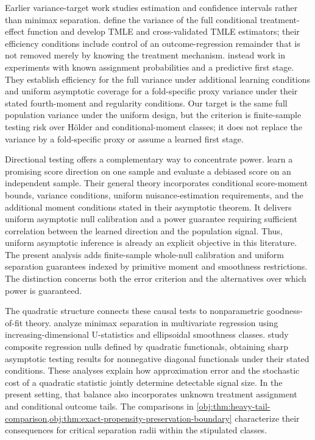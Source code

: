 \documentclass[11pt]{article}
\begin{document}
Earlier variance-target work studies estimation and confidence intervals rather than minimax separation. \citet[Sections 2.1--2.3]{Levy2021} define the variance of the full conditional treatment-effect function and develop TMLE and cross-validated TMLE estimators; their efficiency conditions include control of an outcome-regression remainder that is not removed merely by knowing the treatment mechanism. \citet[Sections 3--4, Theorems 6--7]{SanchezBecerra2023} instead work in experiments with known assignment probabilities and a predictive first stage. They establish efficiency for the full variance under additional learning conditions and uniform asymptotic coverage for a fold-specific proxy variance under their stated fourth-moment and regularity conditions. Our target is the same full population variance under the uniform design, but the criterion is finite-sample testing risk over Hölder and conditional-moment classes; it does not replace the variance by a fold-specific proxy or assume a learned first stage.

Directional testing offers a complementary way to concentrate power. \citet[Section 2.2.1, Assumptions 1--5, Theorem 1, and Corollaries 1--2]{DhawanGuoShah2026Directional} learn a promising score direction on one sample and evaluate a debiased score on an independent sample. Their general theory incorporates conditional score-moment bounds, variance conditions, uniform nuisance-estimation requirements, and the additional moment conditions stated in their asymptotic theorem. It delivers uniform asymptotic null calibration and a power guarantee requiring sufficient correlation between the learned direction and the population signal. Thus, uniform asymptotic inference is already an explicit objective in this literature. The present analysis adds finite-sample whole-null calibration and uniform separation guarantees indexed by primitive moment and smoothness restrictions. The distinction concerns both the error criterion and the alternatives over which power is guaranteed.

The quadratic structure connects these causal tests to nonparametric goodness-of-fit theory. \citet[Sections 2--4 and Theorems 1--2]{IngsterSapatinas2009GoodnessOfFit} analyze minimax separation in multivariate regression using increasing-dimensional U-statistics and ellipsoidal smoothness classes. \citet[Sections 2.3--2.4 and Theorems 1--2]{CommingesDalalyan2013QuadraticNull} study composite regression nulls defined by quadratic functionals, obtaining sharp asymptotic testing results for nonnegative diagonal functionals under their stated conditions. These analyses explain how approximation error and the stochastic cost of a quadratic statistic jointly determine detectable signal size. In the present setting, that balance also incorporates unknown treatment assignment and conditional outcome tails. The comparisons in \cref{obj:thm:heavy-tail-comparison,obj:thm:exact-propensity-preservation-boundary} characterize their consequences for critical separation radii within the stipulated classes.
\end{document}
